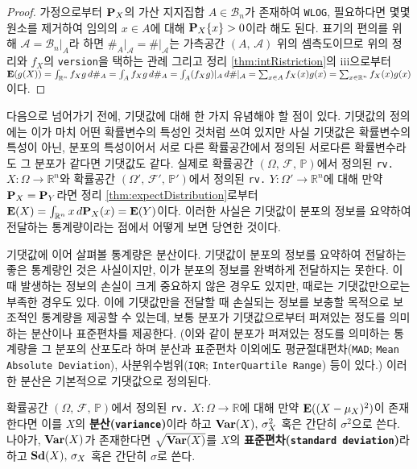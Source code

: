 \begin{proof}
    가정으로부터 $\mathbf{P}_X$의 가산 지지집합 $A\in\mathcal{B}_n$가 존재하여 \texttt{WLOG}, 필요하다면 몇몇 원소를 제거하여 임의의 $x\in A$에 대해 $\mathbf{P}_X\{x\}>0$이라 해도 된다. 표기의 편의를 위해 $\mathcal{A}=\mathcal{B}_n\vert_A$라 하면 $\#_A\vert_\mathcal{A}=\#\vert_\mathcal{A}$는 가측공간 $(A,\,\mathcal{A})$ 위의 셈측도이므로 위의 정리와 $f_X$의 \texttt{version}을 택하는 관례 그리고 정리 \ref{thm:intRistriction}의 iii으로부터 $\mathbf{E}(g(X))=\int_{\mathbb{R}^n}f_Xg\,d\#_A=\int_Af_Xg\,d\#_A=\int_A(f_Xg)\vert_A\,d\#\vert_\mathcal{A}=\sum_{x\in A}f_X(x)g(x)=\sum_{x\in\mathbb{R}^n}f_X(x)g(x)$이다.
\end{proof}

다음으로 넘어가기 전에, 기댓값에 대해 한 가지 유념해야 할 점이 있다. 기댓값의 정의에는 이가 마치 어떤 확률변수의 특성인 것처럼 쓰여 있지만 사실 기댓값은 확률변수의 특성이 아닌, 분포의 특성이어서 서로 다른 확률공간에서 정의된 서로다른 확률변수라도 그 분포가 같다면 기댓값도 같다. 실제로 확률공간 $(\Omega,\,\mathcal{F},\,\mathbb{P})$에서 정의된 \texttt{rv.} $X:\Omega\to\mathbb{R}^n$와 확률공간 $(\Omega',\,\mathcal{F}',\,\mathbb{P}')$에서 정의된 \texttt{rv.} $Y:\Omega'\to\mathbb{R}^n$에 대해 만약 $\mathbf{P}_X=\mathbf{P}_Y$라면 정리 \ref{thm:expectDistribution}로부터 $\mathbf{E}(X)=\int_{\mathbb{R}^n}x\,d\mathbf{P}_X(x)=\mathbf{E}(Y)$이다. 이러한 사실은 기댓값이 분포의 정보를 요약하여 전달하는 통계량이라는 점에서 어떻게 보면 당연한 것이다.

기댓값에 이어 살펴볼 통계량은 분산이다. 기댓값이 분포의 정보를 요약하여 전달하는 좋은 통계량인 것은 사실이지만, 이가 분포의 정보를 완벽하게 전달하지는 못한다. 이때 발생하는 정보의 손실이 크게 중요하지 않은 경우도 있지만, 때로는 기댓값만으로는 부족한 경우도 있다. 이에 기댓값만을 전달할 때 손실되는 정보를 보충할 목적으로 보조적인 통계량을 제공할 수 있는데, 보통 분포가 기댓값으로부터 퍼져있는 정도를 의미하는 분산이나 표준편차를 제공한다. (이와 같이 분포가 퍼져있는 정도를 의미하는 통계량을 그 분포의 산포도라 하며 분산과 표준편차 이외에도 평균절대편차(\texttt{MAD}; \texttt{Mean Absolute Deviation}), 사분위수범위(\texttt{IQR}; \texttt{InterQuartile Range}) 등이 있다.) 이러한 분산은 기본적으로 기댓값으로 정의된다.

\begin{definition}
    확률공간 $(\Omega,\,\mathcal{F},\,\mathbb{P})$에서 정의된 \texttt{rv.} $X:\Omega\to\mathbb{R}$에 대해 만약 $\mathbf{E}((X-\mu_X)^2)$이 존재한다면 이를 $X$의 \textbf{분산(\texttt{variance})}이라 하고 $\mathbf{Var}(X),\,\sigma_X^2$ 혹은 간단히 $\sigma^2$으로 쓴다. 나아가, $\mathbf{Var}(X)$가 존재한다면 $\sqrt{\mathbf{Var}(X)}$를 $X$의 \textbf{표준편차(\texttt{standard deviation})}라 하고 $\mathbf{Sd}(X),\,\sigma_X$ 혹은 간단히 $\sigma$로 쓴다.
\end{definition}

